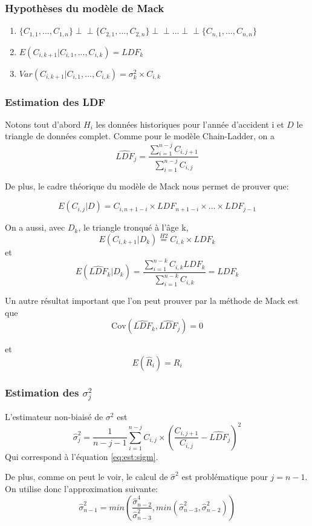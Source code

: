 \documentclass[11pt,french]{report}
\begin{document}
\subsubsection*{ Hypothèses du modèle de Mack}

\begin{enumerate}
\item $\{C_{1,1},...,C_{1,n} \}\perp\!\!\!\perp \{C_{2,1},...,C_{2,n} \} \perp\!\!\!\perp...\perp\!\!\!\perp \{C_{n,1},...,C_{n,n} \}$
\item $ E(C_{i,k+1} | C_{i,1},...,C_{i,k})=LDF_k$
\item $Var(C_{i,k+1} | C_{i,1},...,C_{i,k}) = \sigma_k^2 \times C_{i,k}$
\end{enumerate}


\subsubsection*{ Estimation des LDF}

Notons tout d'abord $H_i$ les données historiques pour l'année d'accident i et $D$ le triangle de données complet. Comme pour le modèle Chain-Ladder, on a
$$\widehat{LDF}_j=\frac{\sum_{i=1}^{n-j} C_{i,j+1}}{\sum_{i=1}^{n-j} C_{i,j}}$$

De plus, le cadre théorique du modèle de Mack nous permet de prouver que:

$$E(C_{i,j}|D)=C_{i,n+1-i} \times LDF_{n+1-i}\times...\times LDF_{j-1}$$

On a aussi, avec $D_k$, le triangle tronqué à l'âge k, 
$$E(C_{i,k+1}|D_k) \overset{H2}{=} C_{i,k} \times LDF_k$$
et 
$$E(\widehat{LDF}_k|D_k)= \frac{\sum_{i=1}^{n-k} C_{i,k}LDF_k}{\sum_{i=1}^{n-k} C_{i,k}}=LDF_k$$

Un autre résultat important que l'on peut prouver par la méthode de Mack est que
$$\text{Cov}(\widehat{LDF}_k,\widehat{LDF}_j)=0$$

et
$$E(\widehat{R}_i)=R_i$$

\subsubsection*{ Estimation des $\sigma_j^2$}

L'estimateur non-biaisé de $\sigma^2$ est
$$\boxed{\widehat{\sigma}_j^2 = \frac{1}{n-j-1}\sum_{i=1}^{n-j}C_{i,j} \times \left(\frac{C_{i,j+1}}{C_{i,j}}-\widehat{LDF}_j \right)^2}$$
Qui correspond à l'équation \ref{eq:est:sigm}.

De plus, comme on peut le voir, le calcul de $\widehat{\sigma}^2$ est problématique pour $j=n-1$. On utilise donc l'approximation suivante:
$$\boxed{\widehat{\sigma}_{n-1}^2=min \left(\frac{\widehat{\sigma}_{n-2}^4}{\widehat{\sigma}_{n-3}^2},min \left(\widehat{\sigma}_{n-3}^2,\widehat{\sigma}_{n-2}^2 \right) \right)}$$
\end{document}
